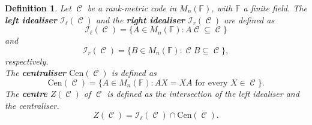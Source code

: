 \documentclass[a4paper, 11pt]{article}
\DeclareMathOperator{\C}{\mathcal{C}}
\newtheorem{definition}[theorem]{Definition}
\newcommand{\F}{{\mathbb F}}
\newcommand{\lid}{\mathcal{I}_{\ell}}
\newcommand{\rid}{\mathcal{I}_{r}}
\newcommand{\cen}{\mathrm{Cen}}
\begin{document}
\begin{definition} Let $\C$ be a rank-metric code in $M_n(\F)$, with $\F$ a finite field. 
The \textbf{left idealiser} $\lid(\C)$ and the \textbf{right idealiser} $\rid(\C)$ are defined as
\[
\lid(\C) = \{A \in M_n(\F) \colon  A\C\subseteq \C\}
\]
and
\[
\rid(\C) = \{B \in M_n(\F) \colon \C B  \subseteq\C\},
\]
respectively. \\
The \textbf{centraliser} $\cen(\C)$ is defined as
\[
\cen(\C) = \{A \in M_{n}(\F) \colon AX=XA \mbox{ 
for every }X\in \C\}.
\]
The \textbf{centre} $Z(\C)$ of $\C$ is defined as the intersection of the left idealiser and the centraliser.
\[
Z(\C) = \lid(\C)\cap \cen(\C).
\]
\end{definition}


%
%
%
%
\end{document}
